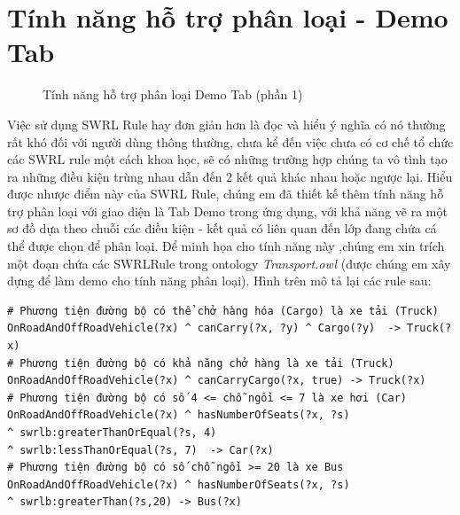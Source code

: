 \section{Tính năng hỗ trợ phân loại - Demo Tab}
\begin{figure}[ht!]
	\centering
	\caption{Tính năng hỗ trợ phân loại Demo Tab (phần 1)\label{overflow}}
\end{figure}
Việc sử dụng SWRL Rule hay đơn giản hơn là đọc và hiểu ý nghĩa có nó thường rất khó đối với người dùng thông thường, chưa kể đến việc chưa có cơ chế tổ chức các SWRL rule một cách khoa học, sẽ có những trường hợp chúng ta vô tình tạo ra những điều kiện trùng nhau dẫn đến 2 kết quả khác nhau hoặc ngược lại. Hiểu được nhược điểm này của SWRL Rule, chúng em đã thiết kế thêm tính năng hỗ trợ phân loại với giao diện là Tab Demo trong ứng dụng, với khả năng vẽ ra một sơ đồ dựa theo chuỗi các điều kiện - kết quả có liên quan đến lớp đang chứa cá thể được chọn để phân loại. Để minh họa cho tính năng này ,chúng em xin trích một đoạn chứa các SWRLRule trong ontology \textit{Transport.owl} \cite{owleditorSrc} (được chúng em xây dựng để làm demo cho tính năng phân loại). Hình trên mô tả lại các rule sau:
\begin{verbatim}
# Phương tiện đường bộ có thể chở hàng hóa (Cargo) là xe tải (Truck)
OnRoadAndOffRoadVehicle(?x) ^ canCarry(?x, ?y) ^ Cargo(?y)  -> Truck(?x)
# Phương tiện đường bộ có khả năng chở hàng là xe tải (Truck)
OnRoadAndOffRoadVehicle(?x) ^ canCarryCargo(?x, true) -> Truck(?x)
# Phương tiện đường bộ có số 4 <= chỗ ngồi <= 7 là xe hơi (Car)
OnRoadAndOffRoadVehicle(?x) ^ hasNumberOfSeats(?x, ?s)
^ swrlb:greaterThanOrEqual(?s, 4) 
^ swrlb:lessThanOrEqual(?s, 7)  -> Car(?x)
# Phương tiện đường bộ có số chỗ ngồi >= 20 là xe Bus 
OnRoadAndOffRoadVehicle(?x) ^ hasNumberOfSeats(?x, ?s) 
^ swrlb:greaterThan(?s,20) -> Bus(?x)                               
\end{verbatim}
